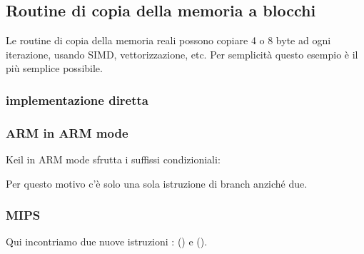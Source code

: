 \subsection{Routine di copia della memoria a blocchi}
\label{loop_memcpy}

Le routine di copia della memoria reali possono copiare 4 o 8 byte ad ogni iterazione, usando \ac{SIMD}, 
vettorizzazione, etc.
Per semplicità questo esempio è il più semplice possibile.



\subsubsection{implementazione diretta}







\subsubsection{ARM in ARM mode}

Keil in ARM mode sfrutta i suffissi condizioniali:



Per questo motivo c'è solo una sola istruzione di branch anziché due.

\subsubsection{MIPS}




Qui incontriamo due nuove istruzioni :  () e  ().

